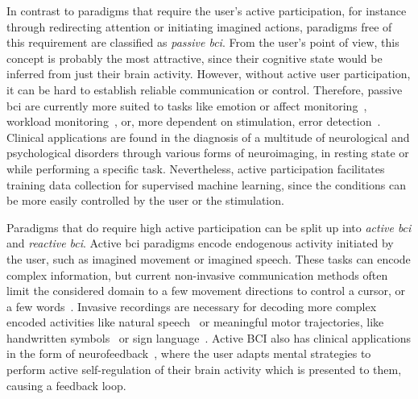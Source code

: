 In contrast to paradigms that require the user's active participation, for
instance through redirecting attention or initiating imagined actions,
paradigms free of this requirement are classified as \emph{passive \ac{bci}}.
From the user's point of view, this concept is probably the most attractive, since their
cognitive state would be inferred from just their brain activity.
However, without active user participation, it can be hard to establish reliable
communication or control.
Therefore, passive \ac{bci} are currently more suited to tasks like emotion or affect
monitoring~\cite{Torres2020,Libert2019, Muehl2014}, workload monitoring~\cite{Zanetti2021},
or, more dependent on stimulation, error detection~\cite{SiMohammed2020}.
Clinical applications are found in the diagnosis of a multitude of neurological
and psychological disorders through various forms of neuroimaging, in resting
state or while performing a specific task.
Nevertheless, active participation facilitates training data collection for supervised
machine learning, since the conditions can be more easily controlled by the user or the
stimulation.

Paradigms that do require high active participation can be split up into \emph{active
\ac{bci}} and \emph{reactive \ac{bci}}.
Active \ac{bci} paradigms encode endogenous activity initiated by the user, such as
imagined movement or imagined speech.
These tasks can encode complex information, but current non-invasive communication
methods often limit the considered domain to a few movement directions to control a
cursor, or a few words~\cite{Panachakel2021}.
Invasive recordings are necessary for decoding more complex encoded activities like
natural speech~\cite{Metzger2023} or meaningful motor trajectories, like handwritten
symbols~\cite{Willett2021} or sign language~\cite{Branco2017}.
Active BCI also has clinical applications in the form of
neurofeedback~\cite{Hammond2011}, where the user adapts mental strategies to
perform active self-regulation of their brain activity which is presented to
them, causing a feedback loop.

